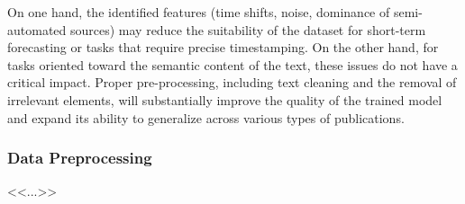 On one hand, the identified features (time shifts, noise, dominance of semi-automated sources) may reduce the suitability of the dataset
for short-term forecasting or tasks that require precise timestamping. On the other hand, for tasks oriented toward the semantic content
of the text, these issues do not have a critical impact. Proper pre-processing, including text cleaning and the removal of irrelevant
elements, will substantially improve the quality of the trained model and expand its ability to generalize across various types of publications.

\subsubsection{Data Preprocessing}
\label{sec:data_prep}
<<...>>
